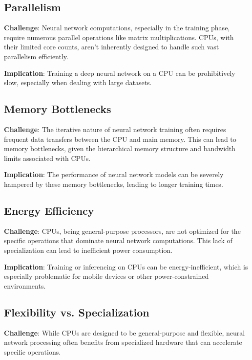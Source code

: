\subsection{Parallelism}

\textbf{Challenge}: Neural network computations, especially in the training phase, require numerous parallel operations like matrix multiplications. CPUs, with their limited core counts, aren't inherently designed to handle such vast parallelism efficiently.

\textbf{Implication}: Training a deep neural network on a CPU can be prohibitively slow, especially when dealing with large datasets.

\subsection{Memory Bottlenecks}

\textbf{Challenge}: The iterative nature of neural network training often requires frequent data transfers between the CPU and main memory. This can lead to memory bottlenecks, given the hierarchical memory structure and bandwidth limits associated with CPUs.

\textbf{Implication}: The performance of neural network models can be severely hampered by these memory bottlenecks, leading to longer training times.

\subsection{Energy Efficiency}

\textbf{Challenge}: CPUs, being general-purpose processors, are not optimized for the specific operations that dominate neural network computations. This lack of specialization can lead to inefficient power consumption.

\textbf{Implication}: Training or inferencing on CPUs can be energy-inefficient, which is especially problematic for mobile devices or other power-constrained environments.

\subsection{Flexibility vs. Specialization}

\textbf{Challenge}: While CPUs are designed to be general-purpose and flexible, neural network processing often benefits from specialized hardware that can accelerate specific operations.

